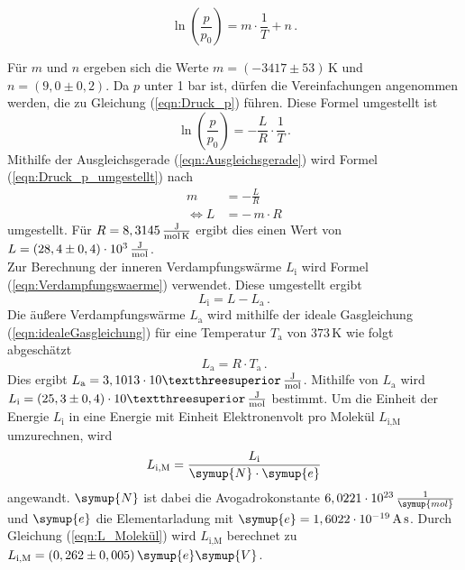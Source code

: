     \begin{equation}
      \label{eqn:Ausgleichsgerade}
      \ln{\left(\frac{p}{p_0}\right)} = m \cdot \frac{1}{T} + n \, . 
    \end{equation}

    Für $m$ und $n$ ergeben sich die Werte $m = (-3417 \pm 53) \, \unit{\kelvin}$
    und $n = (9,0 \pm 0,2)$.
    Da $p$ unter 1 bar ist, dürfen die Vereinfachungen angenommen werden, die zu Gleichung (\ref{eqn:Druck_p}) führen. Diese Formel umgestellt ist 
    \begin{equation}
      \label{eqn:Druck_p_umgestellt}
      \ln{\left(\frac{p}{p_0}\right)} = - \frac{L}{R} \cdot \frac{1}{T} \, . 
    \end{equation}
    Mithilfe der Ausgleichsgerade (\ref{eqn:Ausgleichsgerade}) wird Formel 
    (\ref{eqn:Druck_p_umgestellt}) nach 
    \begin{align}
      m &= - \frac{L}{R} \\
      \Leftrightarrow L &= - \, m \cdot R
    \end{align}
    umgestellt. Für $R = 8,3145 \, \unit[per-mode=fraction]{\joule\per\mol\per\kelvin}$ \cite{R_Konstante} ergibt dies einen Wert von $L = (28,4 \pm 0,4) \cdot 10^3 \, \unit[per-mode=fraction]{\joule\per\mol}$.
    \\
    Zur Berechnung der inneren Verdampfungswärme $L_{\text{i}}$ wird Formel (\ref{eqn:Verdampfungswaerme}) verwendet. Diese umgestellt ergibt 
    \begin{equation}
      L_{\text{i}} = L - L_{\text{a}} \, . 
    \end{equation}
    Die äußere Verdampfungswärme $L_{\text{a}}$ wird mithilfe der ideale Gasgleichung (\ref{eqn:idealeGasgleichung}) für eine Temperatur $T_{\text{a}}$ von $373 \, \unit{\kelvin}$ wie folgt abgeschätzt
    \begin{equation}
      L_{\text{a}} = R \cdot  T_{\text{a}}\, . 
    \end{equation}
    Dies ergibt $L_{\text{a}} = 3,1013 \cdot 10³ \, \unit[per-mode=fraction]{\joule\per\mol}$. 
    Mithilfe von $L_{\text{a}}$ wird $L_{\text{i}} = (25,3 \pm 0,4) \cdot 10³ \, \unit[per-mode=fraction]{\joule\per\mol}$ bestimmt. 
    Um die Einheit der Energie $L_{\text{i}}$ in eine Energie mit Einheit Elektronenvolt pro Molekül $L_{\text{i,M}}$ umzurechnen, wird 
    \begin{equation}
      L_{\text{i,M}} = \frac{L_{\text{i}}}{\symup{N} \cdot \symup{e}}
      \label{eqn:L_Molekül}
    \end{equation}
    angewandt. $\symup{N}$ ist dabei die Avogadrokonstante $6,0221 \cdot 10^{23} \, \frac{1}{\symup{mol}}$ und $\symup{e}$ die Elementarladung mit 
    $\symup{e} = 1,6022 \cdot 10^{-19} \, \unit{\ampere\second}$. 
    Durch Gleichung (\ref{eqn:L_Molekül}) wird $L_{\text{i,M}}$ berechnet zu $L_{\text{i,M}} = (0,262 \pm 0,005) \, \symup{e}\symup{V}$.
    
